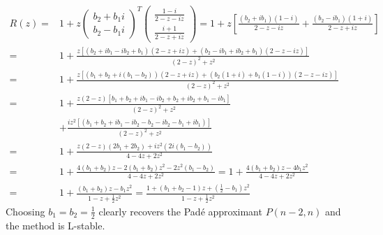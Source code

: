 \documentclass[10pt,a4paper]{article}
\newcommand{\half}[0]{\frac{1}{2}}
\begin{document}
\begin{align*}
  R(z) =& 1 + z \begin{pmatrix}
    b_2 + b_1i  \\
   b_2 - b_1i
  \end{pmatrix}^T\begin{pmatrix}
    \frac{1-i}{2-z - iz} \\
    \frac{i+1}{2 - z + iz}
  \end{pmatrix} = 1 + z \left[ \frac{(b_2+ib_1)(1-i)}{2 -z - iz} + \frac{(b_2- ib_1)(1+i)}{2-z+iz}\right] \\
  =& 1 + \frac{z[(b_2 + ib_1 - ib_2 + b_1)(2 - z + iz) + (b_2 - ib_1 + ib_2 + b_1)(2 - z - iz)]}{(2-z)^2 + z^2} \\
  =& 1 + \frac{z[(b_1 + b_2 + i(b_1 - b_2))(2 - z + iz) + (b_2(1 + i) + b_1(1 - i))(2 - z - iz)]}{(2-z)^2 + z^2} \\
  =& 1 + \frac{z(2-z)\left[b_1 + b_2 + ib_1 - ib_2 + b_2 + ib_2 + b_1 - ib_1\right]}{(2-z)^2 + z^2}  \\
        &+ \frac{iz^2 \left[  (b_1 + b_2 + ib_1 - ib_2 - b_2 - ib_2 - b_1 + ib_1)\right]  }{(2-z)^2 + z^2} \\
  =& 1 + \frac{z(2-z)\left(2b_1 + 2b_2\right) + iz^2\left(2i(b_1 - b_2)\right)}{4 - 4z + 2z^2} \\
  =& 1 + \frac{4(b_1+b_2)z - 2(b_1+b_2)z^2 - 2z^2 (b_1-b_2)}{4 - 4z + 2z^2} = 1 + \frac{4(b_1+b_2)z - 4 b_1 z^2}{4 - 4z + 2z^2} \\
  =& 1 + \frac{(b_1+b_2)z - b_1z^2}{1 - z + \half z^2} = \frac{1 + (b_1+b_2 - 1)z + (\half - b_1) z^2}{1 - z + \half z^2}
\end{align*}
Choosing $b_1 = b_2 = \half$ clearly recovers the Pad\'{e} approximant $P(n-2, n)$ and the method is L-stable.
\end{document}
